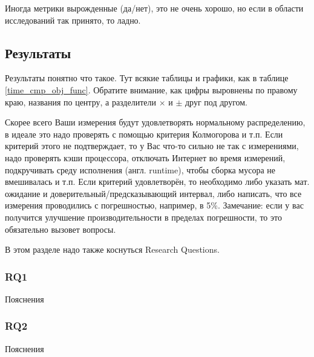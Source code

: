 \noindent Иногда метрики вырожденные (да/нет), это не очень хорошо, но если в области исследований так принято, то ладно.

\subsection{Результаты}
Результаты понятно что такое. Тут всякие таблицы и графики, как в таблице \ref{time_cmp_obj_func}. Обратите внимание, как цифры выровнены по правому краю, названия по центру, а разделители $\times$ и $\pm$ друг под другом.

Скорее всего Ваши измерения будут удовлетворять нормальному распределению, в идеале это надо проверять с помощью критерия Кол\-могорова и т.п. 
Если критерий этого не подтверждает, то у Вас что-то сильно не так с измерениями, надо проверять кэши процессора, отключать Интернет во время измерений, подкручивать среду исполне\-ния (англ. runtime), что\-бы сборка мусора не вмешивалась и т.п. 
Если критерий удовлетворён, то необходимо либо указать мат. ожидание и доверительный/предсказы\-вающий интервал, либо написать, что все измерения проводились с погрешностью, например, в 5\%. 
Замечание: если у вас получится улуч\-шение производительности в пределах погреш\-ности, то это обязательно вызовет вопросы.

В этом разделе надо также коснуться Research Questions.

\subsubsection{RQ1} Пояснения
\subsubsection{RQ2} Пояснения

